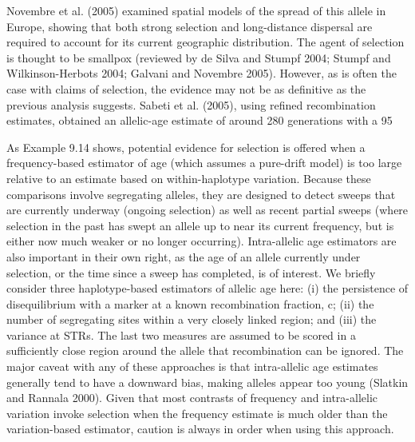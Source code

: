 \documentclass{article}
\begin{document}
Novembre et al. (2005) examined spatial models of the spread of this allele in Europe, showing that both strong selection and long-distance dispersal are required to account for its current geographic distribution. The agent of selection is thought to be smallpox (reviewed by de Silva and Stumpf 2004; Stumpf and Wilkinson-Herbots 2004; Galvani and Novembre 2005). However, as is often the case with claims of selection, the evidence may not be as definitive as the previous analysis suggests. Sabeti et al. (2005), using refined recombination estimates, obtained an allelic-age estimate of around 280 generations with a 95%

As Example 9.14 shows, potential evidence for selection is offered when a frequency-based estimator of age (which assumes a pure-drift model) is too large relative to an estimate based on within-haplotype variation. Because these comparisons involve segregating alleles, they are designed to detect sweeps that are currently underway (ongoing selection) as well as recent partial sweeps (where selection in the past has swept an allele up to near its current frequency, but is either now much weaker or no longer occurring). Intra-allelic age estimators are also important in their own right, as the age of an allele currently under selection, or the time since a sweep has completed, is of interest. We briefly consider three haplotype-based estimators of allelic age here: (i) the persistence of disequilibrium with a marker at a known recombination fraction, c; (ii) the number of segregating sites within a very closely linked region; and (iii) the variance at STRs. The last two measures are assumed to be scored in a sufficiently close region around the allele that recombination can be ignored. The major caveat with any of these approaches is that intra-allelic age estimates generally tend to have a downward bias, making alleles appear too young (Slatkin and Rannala 2000). Given that most contrasts of frequency and intra-allelic variation invoke selection when the frequency estimate is much older than the variation-based estimator, caution is always in order when using this approach.
\end{document}
